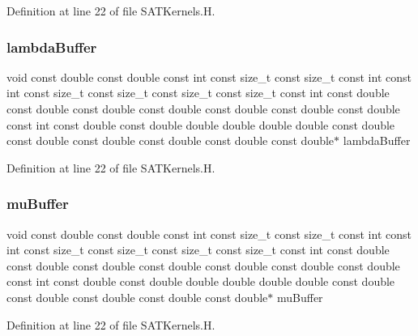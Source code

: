 Definition at line 22 of file S\+A\+T\+Kernels.\+H.

\hypertarget{SATKernels_8H_ac4082886995a4235f6338205c85d04fe}{}\label{SATKernels_8H_ac4082886995a4235f6338205c85d04fe} 
\subsubsection{\texorpdfstring{lambda\+Buffer}{lambdaBuffer}}
{\footnotesize\ttfamily void const double const double const int const size\+\_\+t const size\+\_\+t const int const int const size\+\_\+t const size\+\_\+t const size\+\_\+t const size\+\_\+t const int const double const double const double const double const double const double const double const int const double const double double double double double const double const double const double const double const double const double$\ast$ lambda\+Buffer}



Definition at line 22 of file S\+A\+T\+Kernels.\+H.

\hypertarget{SATKernels_8H_aad34af7cffab47570a25bd8f1427f862}{}\label{SATKernels_8H_aad34af7cffab47570a25bd8f1427f862} 
\subsubsection{\texorpdfstring{mu\+Buffer}{muBuffer}}
{\footnotesize\ttfamily void const double const double const int const size\+\_\+t const size\+\_\+t const int const int const size\+\_\+t const size\+\_\+t const size\+\_\+t const size\+\_\+t const int const double const double const double const double const double const double const double const int const double const double double double double double const double const double const double const double const double$\ast$ mu\+Buffer}



Definition at line 22 of file S\+A\+T\+Kernels.\+H.

\hypertarget{SATKernels_8H_a680185db8546de161968dabace9e94f1}{}\label{SATKernels_8H_a680185db8546de161968dabace9e94f1} 
